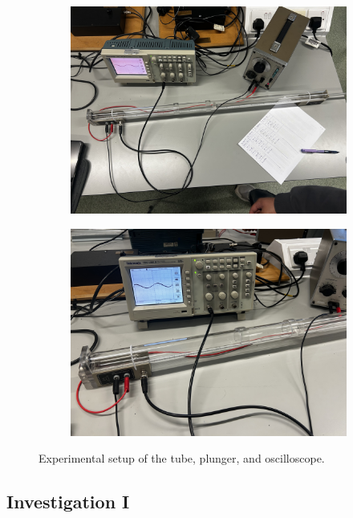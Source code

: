 \documentclass[12pt]{article}
\begin{document}
\begin{figure}[H]
    \centering
    \begin{subfigure}[b]{.49\textwidth}
        \centering
        \includegraphics[width=\linewidth]{exp oscil setup.jpeg}
    \end{subfigure}
    \hfill
    \begin{subfigure}[b]{.49\textwidth}
        \centering
        \includegraphics[width=\linewidth]{exp oscil oscil.jpeg}
    \end{subfigure}
    \caption{Experimental setup of the tube, plunger, and oscilloscope.}
    \label{fig:3}
\end{figure}

\subsection{Investigation I}
\end{document}

